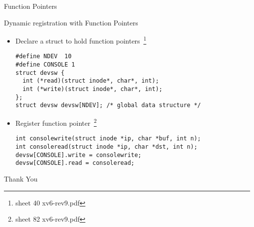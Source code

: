 \documentclass[10pt]{beamer}
\begin{document}
\begin{frame}[standout]
Function Pointers 
\end{frame}
  

\begin{frame}[fragile]{Dynamic registration with Function Pointers}
\small
\begin{itemize}
\item<1-> Declare a struct to hold function pointers~\footnote{sheet 40 xv6-rev9.pdf}
\begin{verbatim}
#define NDEV  10
#define CONSOLE 1
struct devsw {
  int (*read)(struct inode*, char*, int);
  int (*write)(struct inode*, char*, int);
};
struct devsw devsw[NDEV]; /* global data structure */
\end{verbatim}
\item<2-> Register function pointer~\footnote{sheet 82 xv6-rev9.pdf}
\begin{verbatim}
int consolewrite(struct inode *ip, char *buf, int n);
int consoleread(struct inode *ip, char *dst, int n);
devsw[CONSOLE].write = consolewrite;
devsw[CONSOLE].read = consoleread;
\end{verbatim}
\end{itemize}
\end{frame}


\begin{frame}[standout]
  Thank You
\end{frame}
\end{document}
